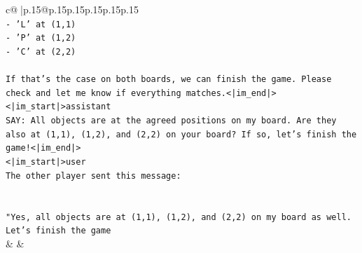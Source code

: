 \documentclass{article}
\begin{document}
{\begin{supertabular}{c@{$\;$}|p{.15\linewidth}@{}p{.15\linewidth}p{.15\linewidth}p{.15\linewidth}p{.15\linewidth}p{.15\linewidth}}
{{{\\ 
\texttt{{-} 'L' at (1,1)} \\
\texttt{{-} 'P' at (1,2)} \\
\texttt{{-} 'C' at (2,2)} \\
\\ 
\texttt{If that's the case on both boards, we can finish the game. Please check and let me know if everything matches.<|im\_end|>} \\
\texttt{<|im\_start|>assistant} \\
\texttt{SAY: All objects are at the agreed positions on my board. Are they also at (1,1), (1,2), and (2,2) on your board? If so, let's finish the game!<|im\_end|>} \\
\texttt{<|im\_start|>user} \\
\texttt{The other player sent this message:} \\
\\ 
\\ 
\texttt{"Yes, all objects are at (1,1), (1,2), and (2,2) on my board as well. Let's finish the game} \\
            }
        }
    }
    & & \\ \\


\end{supertabular}}
\end{document}
